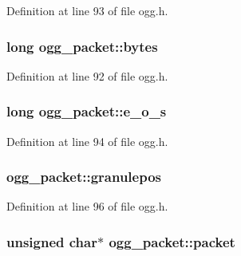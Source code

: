 Definition at line 93 of file ogg.\+h.

\subsubsection[{\texorpdfstring{bytes}{bytes}}]{\setlength{\rightskip}{0pt plus 5cm}long ogg\+\_\+packet\+::bytes}\hypertarget{structogg__packet_a4438269ce6025d8817865ae66d5881f1}{}\label{structogg__packet_a4438269ce6025d8817865ae66d5881f1}


Definition at line 92 of file ogg.\+h.

\subsubsection[{\texorpdfstring{e\+\_\+o\+\_\+s}{e_o_s}}]{\setlength{\rightskip}{0pt plus 5cm}long ogg\+\_\+packet\+::e\+\_\+o\+\_\+s}\hypertarget{structogg__packet_aa367e7c5425c5f65cbd126b82dfc72e8}{}\label{structogg__packet_aa367e7c5425c5f65cbd126b82dfc72e8}


Definition at line 94 of file ogg.\+h.

\subsubsection[{\texorpdfstring{granulepos}{granulepos}}]{ ogg\+\_\+packet\+::granulepos}\hypertarget{structogg__packet_a838d9a000e08bae982409bc2734fc566}{}\label{structogg__packet_a838d9a000e08bae982409bc2734fc566}


Definition at line 96 of file ogg.\+h.

\subsubsection[{\texorpdfstring{packet}{packet}}]{\setlength{\rightskip}{0pt plus 5cm}unsigned char$\ast$ ogg\+\_\+packet\+::packet}\hypertarget{structogg__packet_a57e7096985ec8766dce415e248767c32}{}\label{structogg__packet_a57e7096985ec8766dce415e248767c32}


